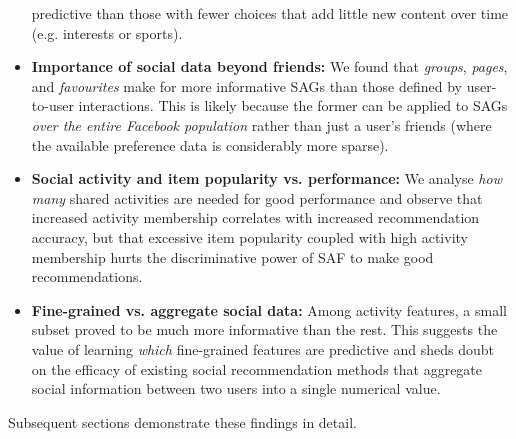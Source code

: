 \begin{itemize}
predictive than those with fewer choices that add little new content
over time (e.g. interests or sports).
\item {\bf Importance of social data beyond friends:} 
We found that \emph{groups}, \emph{pages}, and \emph{favourites} 
make for more informative SAGs than those defined by user-to-user
interactions.  This is likely because the former can be applied to
SAGs \emph{over the entire Facebook population} rather than just a
user's friends (where the available preference data is considerably
more sparse).
\item {\bf Social activity and item popularity vs. performance:} 
We analyse \emph{how many} shared activities are needed for
good performance and observe that increased activity membership correlates
with increased recommendation accuracy, but that excessive item popularity
coupled with high activity membership hurts the discriminative power
of SAF to make good recommendations.
\item {\bf Fine-grained vs. aggregate social data:}
Among activity features, a small subset proved to be much more informative
than the rest.  This suggests the value of
learning \emph{which} fine-grained features are predictive and sheds
doubt on the efficacy of existing social recommendation methods that
aggregate social information between two users into a single numerical
value.
\end{itemize}
Subsequent sections demonstrate these findings in detail.




